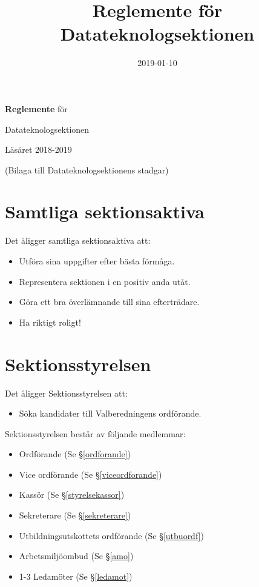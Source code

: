 \documentclass{datateknologsektionen-document}
\title{Reglemente för Datateknologsektionen}
\date{2019-01-10}
\begin{document}
\hspace{0pt}
\vfill
\begin{center}

\Huge{
  \textbf{Reglemente} för
  
  Datateknologsektionen
  
  Läsåret 2018-2019
}

  \vspace{30pt}

\Large{(Bilaga till Datateknologsektionens stadgar)}
  
\end{center}
\vfill
\hspace{0pt}

\pagebreak

\tableofcontents

\pagebreak

\section{Samtliga sektionsaktiva}
Det åligger samtliga sektionsaktiva att:
\begin{itemize}
  \item Utföra sina uppgifter efter bästa förmåga.
  \item Representera sektionen i en positiv anda utåt.
  \item Göra ett bra överlämnande till sina efterträdare.
  \item Ha riktigt roligt!
\end{itemize}
\section{Sektionsstyrelsen}
Det åligger Sektionsstyrelsen att:
\begin{itemize}
  \item Söka kandidater till Valberedningens ordförande.
\end{itemize}
Sektionsstyrelsen består av följande medlemmar:
\begin{itemize}
  \item Ordförande (Se \S \ref{ordforande})
  \item Vice ordförande (Se \S \ref{viceordforande})
  \item Kassör (Se \S \ref{styrelsekassor})
  \item Sekreterare (Se \S \ref{sekreterare})
  \item Utbildningsutskottets ordförande (Se \S \ref{utbuordf})
  \item Arbetsmiljöombud (Se \S \ref{amo})
  \item 1-3 Ledamöter (Se \S \ref{ledamot})
\end{itemize}
\end{document}
